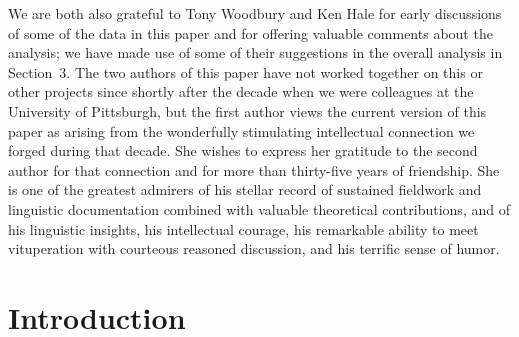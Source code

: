 \documentclass[output=paper,colorlinks,citecolor=brown]{langscibook}
\begin{document}
   We are both also grateful to Tony Woodbury and {\dag}Ken Hale for
   early discussions of some of the data in this paper and for
   offering valuable comments about the analysis; we have made use of
   some of their suggestions in the overall analysis in Section~3.  The
   two authors of this paper have not worked together on this or
   other projects since shortly after the decade when we were
   colleagues at the University of Pittsburgh, but the first author
   views the current version of this paper as arising from the
   wonderfully stimulating intellectual connection we forged during
   that decade.  She wishes to express her gratitude to the second
   author for that connection and for more than thirty-five years of
   friendship.  She is one of the greatest admirers of his stellar
   record of sustained fieldwork and linguistic documentation
   combined with valuable theoretical contributions, and of his
   linguistic insights, his intellectual courage, his remarkable
   ability to meet vituperation with courteous reasoned discussion,
   and his terrific sense of humor.

\section{Introduction}
\end{document}

